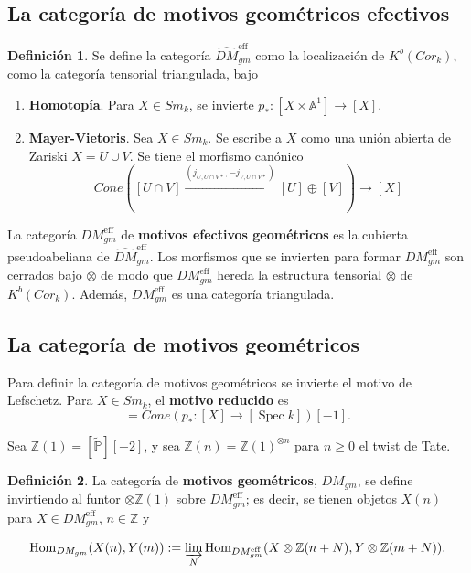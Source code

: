 \documentclass[10pt]{amsart}
\theoremstyle{definition}
\newtheorem{definition}{Definici\'on}[section]
\theoremstyle{remark}
\theoremstyle{definition}
\newcommand{\spec}{\operatorname{Spec}}
\begin{document}
\subsection{La categoría de motivos geométricos efectivos}
\begin{definition} Se define la categoría $\widehat{DM}^{\textrm{eff}}_{gm}$ como la localización de $K^{b}(Cor_{\mathit{k}})$, como la categoría tensorial triangulada, bajo
\begin{enumerate}
\item \textbf{Homotopía}. Para $X \in Sm_{\mathit{k}}$, se invierte $p_{*}:[X \times \mathbb{A}^1] \rightarrow [X]$.
\item \textbf{Mayer-Vietoris}. Sea $X \in Sm_{\mathit{k}}$. Se escribe a $X$ como una unión abierta de Zariski $X=U  \cup V$. Se tiene el morfismo canónico
\[
Cone \left( [U \cap V] \xrightarrow{(j_{U,U\cap V*}, -j_{V,U\cap V*})} [U] \oplus [V] \right) \longrightarrow [X]
\]
\end{enumerate}
\end{definition}

La categoría $DM^{\textrm{eff}}_{gm}$ de \textbf{motivos efectivos geométricos} es la cubierta pseudoabeliana de $\widehat{DM}^{\textrm{eff}}_{gm}$. Los morfismos que se invierten para formar $DM^{\textrm{eff}}_{gm}$ son cerrados bajo $\otimes$ de modo que $DM^{\textrm{eff}}_{gm}$ hereda la estructura tensorial $\otimes$ de $K^{b}(Cor_{\mathit{k}})$. Además, $DM^{\textrm{eff}}_{gm}$ es una categoría triangulada.

\subsection{La categoría de motivos geométricos}
Para definir la categoría de motivos geométricos se invierte el motivo de Lefschetz. Para $X \in Sm_{\mathit{k}}$, el \textbf{motivo reducido} es
\begin{equation*}
[\widetilde{X}] = Cone(p_{*}:[X] \rightarrow [\spec \mathit{k}])[-1].
\end{equation*}

Sea $\mathbb{Z}(1)=[\widetilde{\mathbb{P}}][-2]$, y sea $\mathbb{Z}(n)=\mathbb{Z}(1)^{\otimes n}$ para $n \geq 0$ el twist de Tate.

\begin{definition} La categoría de \textbf{motivos geométricos}, $DM_{gm}$, se define invirtiendo al funtor $\otimes \mathbb{Z}(1)$ sobre $DM^{\textrm{eff}}_{gm}$; es decir, se tienen objetos $X(n)$ para $X \in DM^{\textrm{eff}}_{gm}$, $n \in \mathbb{Z}$ y

\[
\operatorname{Hom}_{DM_{gm}}(X(n), Y(m)) := \varinjlim_{N} \operatorname{Hom}_{DM^{\text{eff}}_{gm}}(X \otimes \mathbb{Z}(n+N), Y \otimes \mathbb{Z}(m+N)).
\]
\end{definition}
\end{document}
